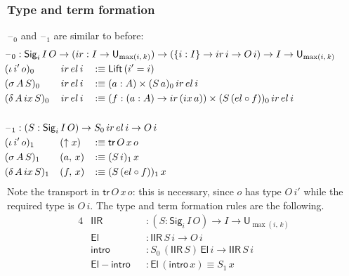 \documentclass[acmsmall,screen,review,anonymous]{acmart}
\newcommand{\msf}[1]{{\mathsf{#1}}}
\newcommand{\U}{\msf{U}}
\newcommand{\El}{\msf{El}}
\newcommand{\Lift}{\msf{Lift}}
\newcommand{\lup}{\uparrow}
\newcommand{\Sig}{\msf{Sig}}
\newcommand{\blank}{{\mathord{\hspace{1pt}\text{--}\hspace{1pt}}}}
\newcommand{\ir}{{ir}}
\newcommand{\el}{{el}}
\newcommand{\ix}{{ix}}
\newcommand{\intro}{\msf{intro}}
\newcommand{\tr}{\msf{tr}}
\newcommand{\IIR}{\msf{IIR}}
\begin{document}
\subsubsection{Type and term formation}\label{sec:iir-type-and-term-formation}
$\blank_0$ and $\blank_1$ are similar to before:
\begin{alignat*}{4}
  &\hspace{-6em}\rlap{$\blank_0 : \Sig_i\,I\,O \to (\ir : I \to \U_{\max(i,\,k)}) \to (\{i : I\} \to \ir\,i \to O\,i) \to I \to \U_{\max(i,\,k)}$} \\
  &\hspace{-6em}(\iota\,i'\,o)     _0\,&&\ir\,\el\,i &&\hspace{-0.2em} :\equiv \Lift\,(i' = i)\\
  &\hspace{-6em}(\sigma\,A\,S)     _0\,&&\ir\,\el\,i &&\hspace{-0.2em} :\equiv (a : A) \times (S\,a)_0\,\ir\,\el\,i\\
  &\hspace{-6em}(\delta\,A\,\ix\,S)_0\,&&\ir\,\el\,i &&\hspace{-0.2em} :\equiv
              (f : (a : A) \to \ir\,(\ix\,a)) \times (S\,(\el \circ f))_0\,\ir\,\el\,i\\
  &\hspace{-6em} && &&\\
  &\hspace{-6em}\rlap{$\blank_1 : (S : \Sig_i\,I\,O) \to S_0\,\ir\,\el\,i \to O\,i$} \\
  &\hspace{-6em}(\iota\,i'\,o)_1\,     &&\hspace{-0.1em}(\lup x) && \hspace{-0.2em}:\equiv \tr\,O\,x\,o\\
  &\hspace{-6em}(\sigma\,A\,S)_1\,     &&\hspace{-0.1em}(a,\,x)  && \hspace{-0.2em}:\equiv (S\,i)_1\,x\\
  &\hspace{-6em}(\delta\,A\,\ix\,S)_1\,&&\hspace{-0.1em}(f,\,x)  && \hspace{-0.2em}:\equiv (S\,(\el \circ f))_1\,x
\end{alignat*}
Note the transport in $\tr\,O\,x\,o$: this is necessary, since $o$ has type $O\,i'$ while the
required type is $O\,i$. The type and term formation rules are the following.
\begin{alignat*}{4}
  &\IIR               && : (S : \Sig_i\,I\,O) \to I \to \U_{\max(i,\,k)}\\
  &\El                && : \IIR\,S\,i \to O\,i\\
  &\intro             && : S_0\,(\IIR\,S)\,\El\,i \to \IIR\,S\,i\\
  &\msf{El\!\!-\!\!intro} && : \El\,(\intro\,x) \equiv S_1\,x
\end{alignat*}
\end{document}
